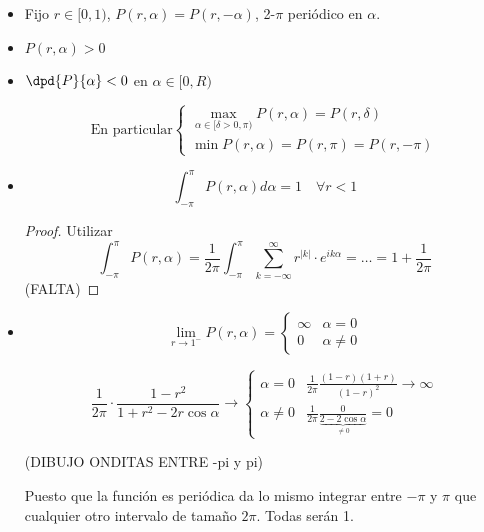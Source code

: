 		\begin{itemize}

			\item Fijo $r \in [0,1)$, $P(r,\alpha) = P(r,-\alpha)$, 2-$\pi$ periódico en $\alpha$.

			\item $P(r,\alpha) > 0$

			\item $\dpd{P}{\alpha} < 0$ en $\alpha \in [0,R)$

			\[ \text{En particular} \begin{cases}
				\max_{\alpha \in [\delta > 0, \pi)} P(r,\alpha) = P(r,\delta) \\
				\min P(r,\alpha) = P(r,\pi) = P(r,-\pi)
			\end{cases} \]

			\item \[
				\int_{-\pi}^\pi P(r, \alpha) d\alpha = 1 \quad \forall r < 1
			\]

			\begin{proof}
				Utilizar \[ \int_{-\pi}^\pi P(r, \alpha) = \frac{1}{2\pi} \int_{-\pi}^\pi \sum_{k=-\infty}^{\infty} r^{|k|} \cdot e^{ik\alpha}  = … = 1 + \frac{1}{2\pi}  \]
				(FALTA)
			\end{proof}


			\item \[
			\lim_{r \to 1^-} P(r, \alpha) = \begin{cases}
				\infty & \alpha = 0 \\
				0 & \alpha \neq 0
			\end{cases}
			\]

			\[
				\frac{1}{2\pi} \cdot \frac{1-r^2}{1+r^2-2r\cos \alpha} \rightarrow \begin{cases}
				\alpha = 0 & \frac{1}{2\pi} \frac{(1-r)(1+r)}{(1-r)^2} \rightarrow \infty \\
				\alpha \neq 0  & \frac{1}{2\pi} \frac{0}{\underbrace{2-2\cos \alpha}_{\neq 0}} = 0
				\end{cases}
			\]

			(DIBUJO ONDITAS ENTRE -pi y pi)

			Puesto que la función es periódica da lo mismo integrar entre $-\pi$ y $\pi$ que cualquier otro intervalo de tamaño $2\pi$. Todas serán 1.

		\end{itemize}

